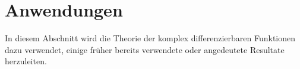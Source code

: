 %
%
%
\section{Anwendungen
\label{buch:funktionentheorie:section:anwendungen}}
In diesem Abschnitt wird die Theorie der komplex differenzierbaren
Funktionen dazu verwendet, einige früher bereits verwendete oder
angedeutete Resultate herzuleiten.




